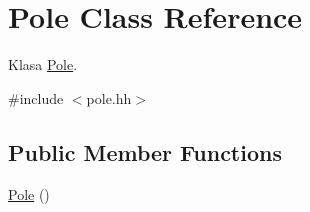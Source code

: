 \hypertarget{class_pole}{\section{Pole Class Reference}
\label{class_pole}
}


Klasa \hyperlink{class_pole}{Pole}.  




{\ttfamily \#include $<$pole.\+hh$>$}

\subsection*{Public Member Functions}
\begin{DoxyCompactItemize}
\item 
\hypertarget{class_pole_ae07d230d40c34e5bc67e2016b3aa9db1}{\hyperlink{class_pole_ae07d230d40c34e5bc67e2016b3aa9db1}{Pole} ()}\label{class_pole_ae07d230d40c34e5bc67e2016b3aa9db1}


\end{DoxyCompactItemize}
